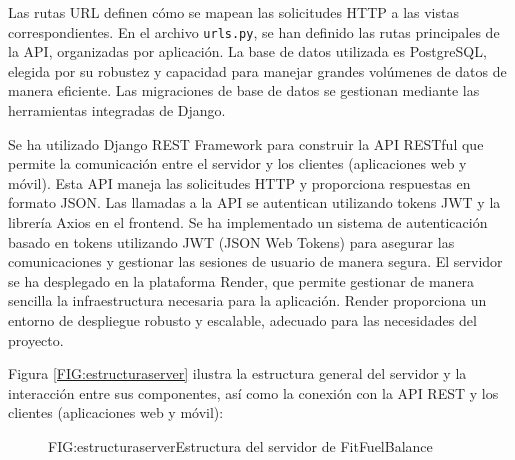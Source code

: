 Las rutas URL definen cómo se mapean las solicitudes HTTP a las vistas correspondientes. En el archivo \texttt{urls.py}, se han definido las rutas principales de la API, organizadas por aplicación. La base de datos utilizada es PostgreSQL, elegida por su robustez y capacidad para manejar grandes volúmenes de datos de manera eficiente. Las migraciones de base de datos se gestionan mediante las herramientas integradas de Django.

Se ha utilizado Django REST Framework para construir la API RESTful que permite la comunicación entre el servidor y los clientes (aplicaciones web y móvil). Esta API maneja las solicitudes HTTP y proporciona respuestas en formato JSON. Las llamadas a la API se autentican utilizando tokens JWT y la librería Axios en el frontend. Se ha implementado un sistema de autenticación basado en tokens utilizando JWT (JSON Web Tokens) para asegurar las comunicaciones y gestionar las sesiones de usuario de manera segura. El servidor se ha desplegado en la plataforma Render, que permite gestionar de manera sencilla la infraestructura necesaria para la aplicación. Render proporciona un entorno de despliegue robusto y escalable, adecuado para las necesidades del proyecto.

Figura \ref{FIG:estructuraserver} ilustra la estructura general del servidor y la interacción entre sus componentes, así como la conexión con la API REST y los clientes (aplicaciones web y móvil):

\begin{figure}[Distribución Estructura Servidor]{FIG:estructuraserver}{Estructura del servidor de FitFuelBalance}
\end{figure}